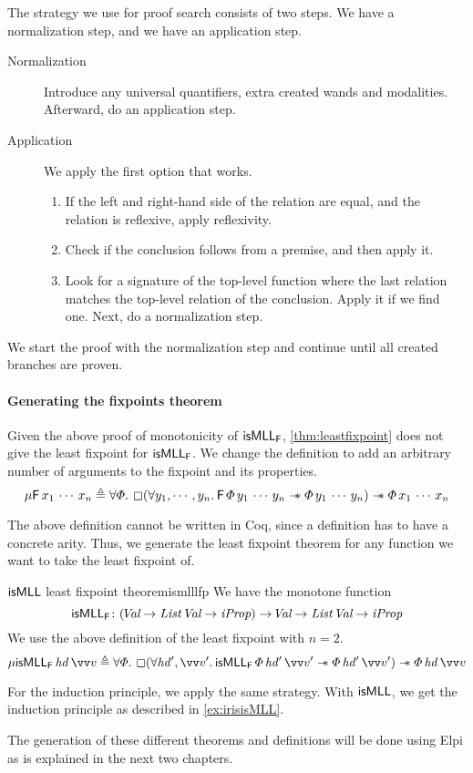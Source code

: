 \documentclass[thesis.tex]{subfiles}
\begin{document}
The strategy we use for proof search consists of two steps. We have a normalization step, and we have an application step.
\begin{description}
    \item[Normalization] Introduce any universal quantifiers, extra created wands and modalities. Afterward, do an application step.
    \item[Application] We apply the first option that works.
          \begin{enumerate}
              \item If the left and right-hand side of the relation are equal, and the relation is reflexive, apply reflexivity.
              \item Check if the conclusion follows from a premise, and then apply it.
              \item Look for a signature of the top-level function where the last relation matches the top-level relation of the conclusion. Apply it if we find one. Next, do a normalization step.
          \end{enumerate}
\end{description}
We start the proof with the normalization step and continue until all created branches are proven.

\paragraph{Generating the fixpoints theorem}
Given the above proof of monotonicity of $\textsf{\upshape isMLL}_{\textsf{\upshape F}}$, \cref{thm:leastfixpoint} does not give the least fixpoint for $\textsf{\upshape isMLL}_{\textsf{\upshape F}}$. We change the definition to add an arbitrary number of arguments to the fixpoint and its properties.
\[
    \lfp\hopred\,\var_1\,\cdots\,\var_n \eqdef \All \pred. \always(\All \varB_1,\cdots,\varB_n. \hopred\, \pred\, \varB_1\,\cdots\,\varB_n \wand \pred\, \varB_1\,\cdots\,\varB_n) \wand \pred \, \var_1\,\cdots\,\var_n
\]

The above definition cannot be written in Coq, since a definition has to have a concrete arity. Thus, we generate the least fixpoint theorem for any function we want to take the least fixpoint of.
\begin{example}{$\textsf{\upshape isMLL}$ least fixpoint theorem}{ismlllfp}
    We have the monotone function
    \[ \textsf{\upshape isMLL}_{\textsf{\upshape F}}\colon (\kern-0.2em\textit{Val} \to \textit{List}\ \kern-0.2em\textit{Val} \to \textit{iProp}) \to \kern-0.2em\textit{Val} \to \textit{List}\ \kern-0.2em\textit{Val} \to \textit{iProp} \]
    We use the above definition of the least fixpoint with $n = 2$.
    \[ \lfp\isMLL_\hopred\,\hd\,\vect{\val} \eqdef \All \pred. \always(\All \hd',\vect{\val}'. \isMLL_\hopred\, \pred\, \hd'\, \vect{\val}' \wand \pred\, \hd'\, \vect{\val}') \wand \pred\, \hd\, \vect{\val} \]
\end{example}
For the induction principle, we apply the same strategy. With $\textsf{\upshape isMLL}$, we get the induction principle as described in \cref{ex:irisisMLL}.

The generation of these different theorems and definitions will be done using Elpi as is explained in the next two chapters.
\end{document}
